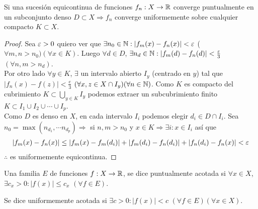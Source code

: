 \begin{theorem}
  Si una sucesión equicontinua de funciones \(f_n: X \to \mathbb{R} \) converge puntualmente en un subconjunto denso \(D \subset X \Rightarrow f_n\) converge uniformemente sobre cualquier compacto \(K \subset X\).

  \begin{proof}
    Sea \(\varepsilon > 0\) quiero ver que \(\exists n_0 \in \mathbb{N} : |f_m(x) - f_n(x)| < \varepsilon \) (\(\forall m, n > n_0)(\forall x \in K)\). Luego \(\forall d \in D\), \(\exists n_d \in \mathbb{N} : |f_m(d) - f_n(d)| < \frac{\varepsilon}{3} \) \((\forall n, m > n_d)\). \\
    Por otro lado \(\forall y \in K\), \(\exists \) un intervalo abierto \(I_y\) (centrado en \(y\)) tal que \(|f_n(x) - f(z)| < \frac{e}{3} \) \((\forall x, z \in X \cap I_y)(\forall n \in \mathbb{N})\). Como \(K\) es compacto del cubrimiento \(K \subset \bigcup_{y \in K} I_y\) podemos extraer un subcubrimiento finito \(K \subset I_1 \cup I_2 \cup \cdots \cup I_p\). \\
    Como \(D\) es denso en \(X\), en cada intervalo \(I_i\) podemos elegir \(d_i \in D \cap I_i\). Sea \(n_0 = \max(n_{d_1}, \cdots n_{d_p}) \Rightarrow \) si \(n, m > n_0\) y \(x \in K \Rightarrow \exists i : x \in I_i\) así que \begin{align*}
      |f_m(x) - f_n(x)| \leq |f_m(x) - f_m(d_i)| + |f_m(d_i) - f_n(d_i)| + |f_n(d_i) - f_n(x)| < \varepsilon
    \end{align*} \(\therefore \) es uniformemente equicontinua.
  \end{proof}
\end{theorem}

\begin{definition}
  Una familia \(E\) de funciones \(f: X \to \mathbb{R} \), se dice puntualmente acotada si \(\forall x \in X\), \(\exists c_x > 0 : |f(x)| \leq c_x\) \((\forall f \in E)\).
\end{definition}

\begin{definition}
  Se dice uniformemente acotada si \(\exists c > 0 : |f(x)| < c\) \((\forall f \in E)(\forall x \in X)\).
\end{definition}


